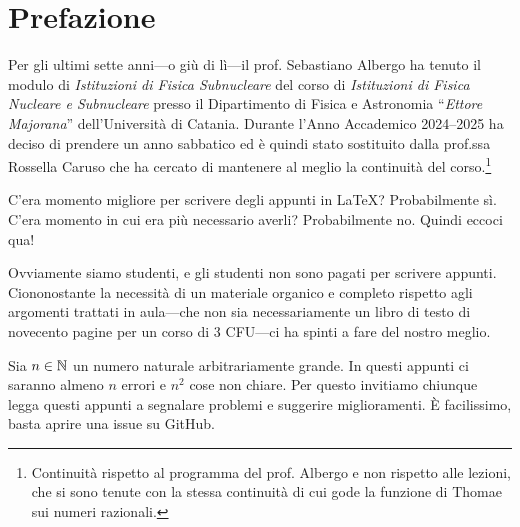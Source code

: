 \chapter{Prefazione}
    Per gli ultimi sette anni---o giù di lì---il prof. Sebastiano Albergo ha tenuto il modulo di \textit{Istituzioni di Fisica Subnucleare} del corso di \textit{Istituzioni di Fisica Nucleare e Subnucleare} presso il Dipartimento di Fisica e Astronomia ``\textit{Ettore Majorana}'' dell'Università di Catania. Durante l'Anno Accademico 2024--2025 ha deciso di prendere un anno sabbatico ed è quindi stato sostituito dalla prof.ssa Rossella Caruso che ha cercato di mantenere al meglio la continuità del corso.\footnote{Continuità rispetto al programma del prof. Albergo e non rispetto alle lezioni, che si sono tenute con la stessa continuità di cui gode la funzione di Thomae sui numeri razionali.}

    C'era momento migliore per scrivere degli appunti in \LaTeX? Probabilmente sì. C'era momento in cui era più necessario averli? Probabilmente no. Quindi eccoci qua!

    Ovviamente siamo studenti, e gli studenti non sono pagati per scrivere appunti. Ciononostante la necessità di un materiale organico e completo rispetto agli argomenti trattati in aula---che non sia necessariamente un libro di testo di novecento pagine per un corso di 3 CFU---ci ha spinti a fare del nostro meglio.

    Sia $n \in \mathbb{N}$ un numero naturale arbitrariamente grande. In questi appunti ci saranno almeno $n$ errori e $n^2$ cose non chiare. Per questo invitiamo chiunque legga questi appunti a segnalare problemi e suggerire miglioramenti. È facilissimo, basta aprire una issue su GitHub.

    {\flushright\theauthor}
 
